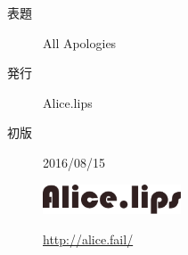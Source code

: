 \documentclass[b5paper,12pt]{jbook}
\begin{document}
\thispagestyle{empty}
\vspace*{110mm}
\begin{flushright}
    \begin{minipage}{70mm}
        \begin{screen}
            \begin{description}
                \item[表題] All Apologies
                \item[発行] Alice.lips
                \item[初版] 2016/08/15
                \item[] \hspace*{3mm} \includegraphics[width=41mm, bb=0 0 476 103]{resources/logo.png} \vspace*{-4mm}
                \item[] \hspace*{18mm} \url{http://alice.fail/}
            \end{description}
        \end{screen}
    \end{minipage}
\end{flushright}
\end{document}
